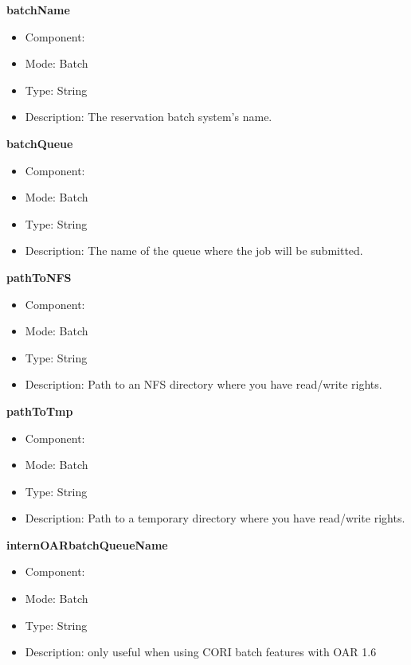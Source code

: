 \begin{description}
\item{\bf{batchName}}
  \begin{itemize}
  \item Component: \sed
  \item Mode: Batch
  \item Type: String
  \item Description: The reservation batch system's name.
  \end{itemize}

\item{\bf{batchQueue}}
  \begin{itemize}
  \item Component: \sed
  \item Mode: Batch
  \item Type: String
  \item Description: The name of the queue where the job will be submitted.
  \end{itemize}

\item{\bf{pathToNFS}}
  \begin{itemize}
  \item Component: \sed
  \item Mode: Batch
  \item Type: String
  \item Description: Path to an NFS directory where you have read/write rights.
  \end{itemize}

\item{\bf{pathToTmp}}
  \begin{itemize}
  \item Component: \sed
  \item Mode: Batch
  \item Type: String
  \item Description: Path to a temporary directory where you have
    read/write rights.
  \end{itemize}

\item{\bf{internOARbatchQueueName}}
  \begin{itemize}
  \item Component: \sed
  \item Mode: Batch
  \item Type: String
  \item Description: only useful when using CORI batch features with
    OAR 1.6
  \end{itemize}


\end{description}
